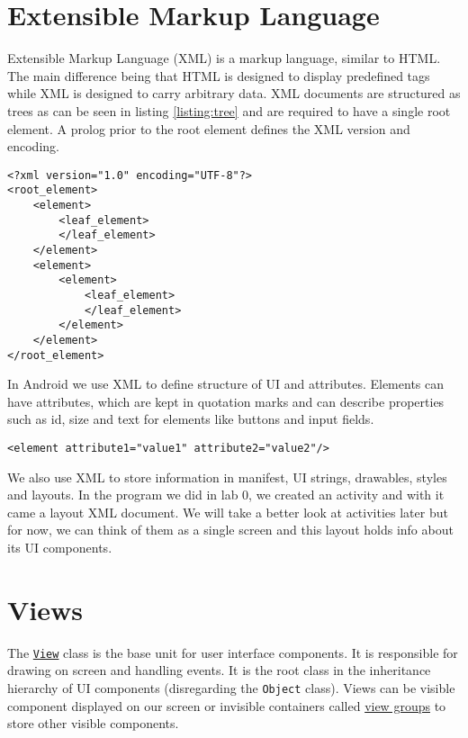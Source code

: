 \graphicspath{{./lab01/Images/}}


\maketocpage

\section{Extensible Markup Language}
Extensible Markup Language (XML) is a markup language, similar to HTML. The main difference being that HTML is designed to display predefined tags while XML is designed to carry arbitrary data. XML documents are structured as trees as can be seen in listing \ref{listing:tree} and are required to have a single root element. A prolog prior to the root element defines the XML version and encoding.
\begin{lstlisting}[style=A_XML, caption={XML tree structure}, label = {listing:tree}]
<?xml version="1.0" encoding="UTF-8"?>
<root_element>
    <element>
        <leaf_element>
        </leaf_element>
    </element>
    <element>
        <element>
            <leaf_element>
            </leaf_element>
        </element>
    </element>
</root_element>
\end{lstlisting}
In Android we use XML to define structure of UI and attributes. Elements can have attributes, which are kept in quotation marks and can describe properties such as id, size and text for elements like buttons and input fields.
\begin{lstlisting}[style=A_XML]
<element attribute1="value1" attribute2="value2"/>
\end{lstlisting}
We also use XML to store information in manifest, UI strings, drawables, styles and layouts. In the program we did in lab 0, we created an activity and with it came a layout XML document. We will take a better look at activities later but for now, we can think of them as a single screen and this layout holds info about its UI components.

\section{Views}
The \href{https://developer.android.com/reference/android/view/View.html}{\texttt{View}} class is the base unit for user interface components. It is responsible for drawing on screen and handling events. It is the root class in the inheritance hierarchy of UI components (disregarding the \texttt{Object} class). Views can be visible component displayed on our screen or invisible containers called \href{https://developer.android.com/reference/android/view/ViewGroup.html}{view groups} to store other visible components. 


